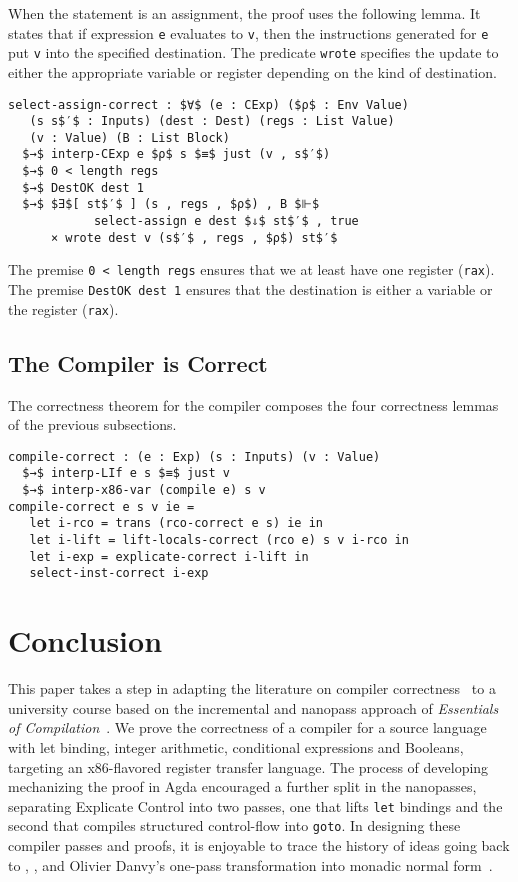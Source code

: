 \documentclass[sigplan,review,dvipsnames,screen,10pt]{acmart}
\begin{document}
When the statement is an assignment, the proof uses the following
lemma. It states that if expression \lstinline{e} evaluates to
\lstinline{v}, then the instructions generated for \lstinline{e} put
\lstinline{v} into the specified destination. The predicate
\lstinline{wrote} specifies the update to either the appropriate
variable or register depending on the kind of destination.

\begin{lstlisting}
select-assign-correct : $∀$ (e : CExp) ($ρ$ : Env Value)
   (s s$′$ : Inputs) (dest : Dest) (regs : List Value)
   (v : Value) (B : List Block) 
  $→$ interp-CExp e $ρ$ s $≡$ just (v , s$′$)
  $→$ 0 < length regs
  $→$ DestOK dest 1
  $→$ $∃$[ st$′$ ] (s , regs , $ρ$) , B $⊩$
            select-assign e dest $⇓$ st$′$ , true
      × wrote dest v (s$′$ , regs , $ρ$) st$′$
\end{lstlisting}

\noindent The premise \lstinline{0 < length regs} ensures that we at
least have one register (\lstinline{rax}). The premise
\lstinline{DestOK dest 1} ensures that the destination is either a
variable or the register (\lstinline{rax}).

\subsection{The Compiler is Correct}

The correctness theorem for the compiler composes the four correctness
lemmas of the previous subsections.

\begin{lstlisting}
compile-correct : (e : Exp) (s : Inputs) (v : Value)
  $→$ interp-LIf e s $≡$ just v
  $→$ interp-x86-var (compile e) s v
compile-correct e s v ie =
   let i-rco = trans (rco-correct e s) ie in
   let i-lift = lift-locals-correct (rco e) s v i-rco in
   let i-exp = explicate-correct i-lift in
   select-inst-correct i-exp
\end{lstlisting}


\section{Conclusion}

This paper takes a step in adapting the literature on compiler
correctness~\citep{Leroy:2006fe,Kumar:2014aa} to a university course
based on the incremental and nanopass approach of \emph{Essentials of
Compilation}~\citep{Siek:2023tr,Siek:2023ue}. We prove the correctness
of a compiler for a source language with let binding, integer
arithmetic, conditional expressions and Booleans, targeting an
x86-flavored register transfer language. The process of developing
mechanizing the proof in Agda encouraged a further split in the
nanopasses, separating Explicate Control into two passes, one that
lifts \lstinline{let} bindings and the second that compiles structured
control-flow into \lstinline{goto}. In designing these compiler passes
and proofs, it is enjoyable to trace the history of ideas going back
to \citet{Aho:1986qf}, \citet{Dybvig:1990aa}, and Olivier Danvy's
one-pass transformation into monadic normal form~\citep{Danvy:2003fk}.






\end{document}
